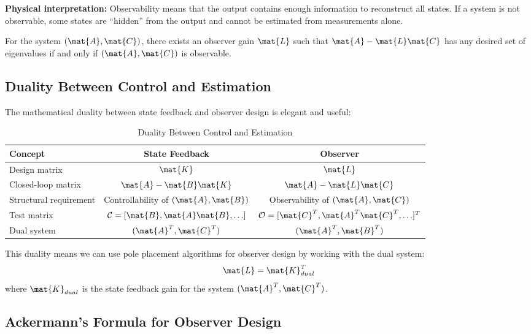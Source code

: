 \textbf{Physical interpretation:} Observability means that the output contains enough information to reconstruct all states. If a system is not observable, some states are ``hidden'' from the output and cannot be estimated from measurements alone.

\begin{theorem}
For the system $(\mat{A}, \mat{C})$, there exists an observer gain $\mat{L}$ such that $\mat{A} - \mat{L}\mat{C}$ has any desired set of eigenvalues if and only if $(\mat{A}, \mat{C})$ is observable.
\end{theorem}

\subsection{Duality Between Control and Estimation}

The mathematical duality between state feedback and observer design is elegant and useful:

\begin{table}[htbp]
\centering
\caption{Duality Between Control and Estimation}
\label{tab:duality}
\begin{tabular}{lcc}
\toprule
\textbf{Concept} & \textbf{State Feedback} & \textbf{Observer} \\
\midrule
Design matrix & $\mat{K}$ & $\mat{L}$ \\
Closed-loop matrix & $\mat{A} - \mat{B}\mat{K}$ & $\mat{A} - \mat{L}\mat{C}$ \\
Structural requirement & Controllability of $(\mat{A}, \mat{B})$ & Observability of $(\mat{A}, \mat{C})$ \\
Test matrix & $\mathcal{C} = [\mat{B}, \mat{A}\mat{B}, \ldots]$ & $\mathcal{O} = [\mat{C}^T, \mat{A}^T\mat{C}^T, \ldots]^T$ \\
Dual system & $(\mat{A}^T, \mat{C}^T)$ & $(\mat{A}^T, \mat{B}^T)$ \\
\bottomrule
\end{tabular}
\end{table}

This duality means we can use pole placement algorithms for observer design by working with the dual system:
\begin{equation}
\mat{L} = \mat{K}_{dual}^T
\end{equation}
where $\mat{K}_{dual}$ is the state feedback gain for the system $(\mat{A}^T, \mat{C}^T)$.

\subsection{Ackermann's Formula for Observer Design}

